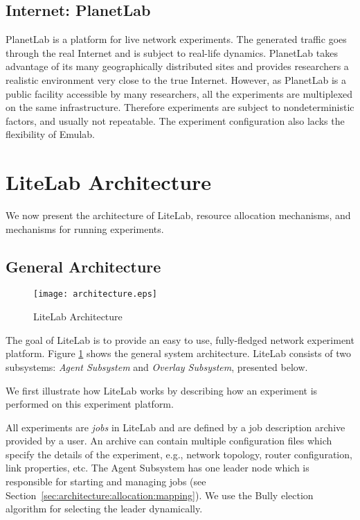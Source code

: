 \documentclass[conference]{IEEEtran}
\begin{document}
\subsection{Internet: PlanetLab}
PlanetLab\cite{Chun:2003:POT:956993.956995,
  Peterson:2003:BID:774763.774772} is a platform for live network
experiments. The generated traffic goes through the real Internet and
is subject to real-life dynamics. PlanetLab takes advantage of its
many geographically distributed sites and provides researchers a
realistic environment very close to the true Internet.  However, as
PlanetLab is a public facility accessible by many researchers, all the
experiments are multiplexed on the same infrastructure. Therefore
experiments are subject to nondeterministic factors, and usually not
repeatable. The experiment configuration also lacks the flexibility of
Emulab.




\section{LiteLab Architecture}
\label{sec:architecture}

We now present the architecture of LiteLab, resource allocation
mechanisms, and mechanisms for running experiments.

\subsection{General Architecture}

\begin{figure}[!tb]
  \centering
  \texttt{[image: architecture.eps]}
  \caption{LiteLab Architecture}
  \label{sec:architecture:architecture}
\end{figure}

The goal of LiteLab is to provide an easy to use, fully-fledged
network experiment platform. Figure
\ref{sec:architecture:architecture} shows the general system
architecture. LiteLab consists of two subsystems: \textit{Agent
  Subsystem} and \textit{Overlay Subsystem}, presented
below.

We first illustrate how LiteLab works by describing how an experiment
is performed on this experiment platform.

All experiments are \textit{jobs} in LiteLab and are defined by a job
description archive provided by a user. An archive can contain
multiple configuration files which specify the details of the
experiment, e.g., network topology, router configuration, link
properties, etc. The Agent Subsystem has one leader node which is
responsible for starting and managing jobs (see
Section~\ref{sec:architecture:allocation:mapping}). We use the Bully
election algorithm for selecting the leader dynamically.
\end{document}
